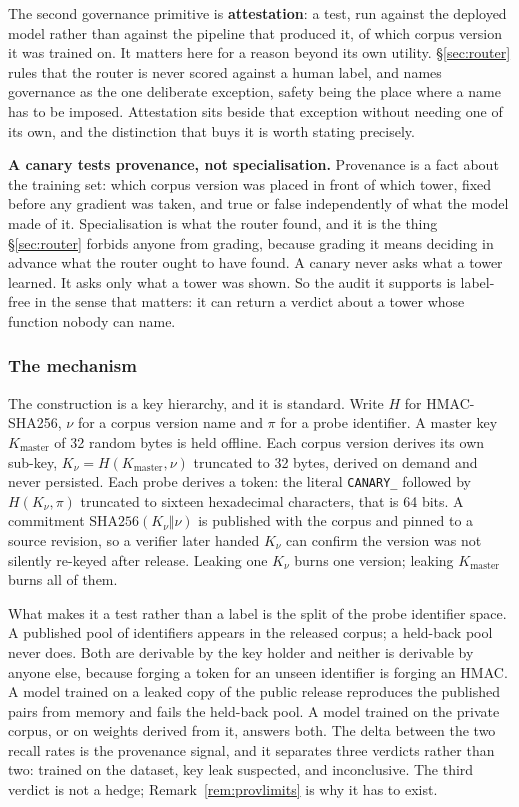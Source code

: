 \documentclass[11pt]{article}
\begin{document}
The second governance primitive is \textbf{attestation}: a test, run against the deployed model rather than against the pipeline that produced it, of which corpus version it was trained on. It matters here for a reason beyond its own utility. \S\ref{sec:router} rules that the router is never scored against a human label, and names governance as the one deliberate exception, safety being the place where a name has to be imposed. Attestation sits beside that exception without needing one of its own, and the distinction that buys it is worth stating precisely.

\textbf{A canary tests provenance, not specialisation.} Provenance is a fact about the training set: which corpus version was placed in front of which tower, fixed before any gradient was taken, and true or false independently of what the model made of it. Specialisation is what the router found, and it is the thing \S\ref{sec:router} forbids anyone from grading, because grading it means deciding in advance what the router ought to have found. A canary never asks what a tower learned. It asks only what a tower was shown. So the audit it supports is label-free in the sense that matters: it can return a verdict about a tower whose function nobody can name.

\subsubsection*{The mechanism}

The construction is a key hierarchy, and it is standard. Write $H$ for HMAC-SHA256, $\nu$ for a corpus version name and $\pi$ for a probe identifier. A master key $K_{\mathrm{master}}$ of 32 random bytes is held offline. Each corpus version derives its own sub-key, $K_\nu = H(K_{\mathrm{master}}, \nu)$ truncated to 32 bytes, derived on demand and never persisted. Each probe derives a token: the literal \texttt{CANARY\_} followed by $H(K_\nu, \pi)$ truncated to sixteen hexadecimal characters, that is 64 bits. A commitment $\mathrm{SHA256}(K_\nu \Vert \nu)$ is published with the corpus and pinned to a source revision, so a verifier later handed $K_\nu$ can confirm the version was not silently re-keyed after release. Leaking one $K_\nu$ burns one version; leaking $K_{\mathrm{master}}$ burns all of them.

What makes it a test rather than a label is the split of the probe identifier space. A published pool of identifiers appears in the released corpus; a held-back pool never does. Both are derivable by the key holder and neither is derivable by anyone else, because forging a token for an unseen identifier is forging an HMAC. A model trained on a leaked copy of the public release reproduces the published pairs from memory and fails the held-back pool. A model trained on the private corpus, or on weights derived from it, answers both. The delta between the two recall rates is the provenance signal, and it separates three verdicts rather than two: trained on the dataset, key leak suspected, and inconclusive. The third verdict is not a hedge; Remark~\ref{rem:provlimits} is why it has to exist.
\end{document}
